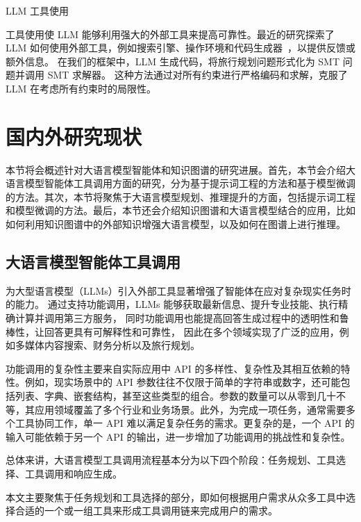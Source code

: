 LLM 工具使用

工具使用使 LLM 能够利用强大的外部工具来提高可靠性。最近的研究探索了 LLM 如何使用外部工具，例如搜索引擎、操作环境和代码生成器~\cite{press2022measuring, yao2022react, schick2024toolformer, liang2023code, singh2023progprompt, peng2023check, song2023llm, huang2022inner}，以提供反馈或额外信息。
在我们的框架中，LLM 生成代码，将旅行规划问题形式化为 SMT 问题并调用 SMT 求解器。
这种方法通过对所有约束进行严格编码和求解，克服了 LLM 在考虑所有约束时的局限性。


\section{国内外研究现状}

本节将会概述针对大语言模型智能体和知识图谱的研究进展。首先，本节会介绍大语言模型智能体工具调用方面的研究，分为基于提示词工程的方法和基于模型微调的方法。其次，本节将聚焦于大语言模型规划、推理提升的方面，包括提示词工程和模型微调的方法。最后，本节还会介绍知识图谱和大语言模型结合的应用，比如如何利用知识图谱中的外部知识增强大语言模型，以及如何在图谱上进行推理。

\subsection{大语言模型智能体工具调用}

为大型语言模型（LLMs）引入外部工具显著增强了智能体在应对复杂现实任务时的能力\cite{huang2024planning, Qin2023, qu2024tool}。
通过支持功能调用，LLMs 能够获取最新信息、提升专业技能、执行精确计算并调用第三方服务，
同时功能调用也能提高回答生成过程中的透明性和鲁棒性，让回答更具有可解释性和可靠性，
因此在多个领域实现了广泛的应用，例如多媒体内容搜索\cite{Song2023}、财务分析\cite{theuma2024equipping}以及旅行规划\cite{hao2024large}。

功能调用的复杂性主要来自实际应用中 API 的多样性、复杂性及其相互依赖的特性\cite{Qin2023}。例如，现实场景中的 API 参数往往不仅限于简单的字符串或数字，还可能包括列表、字典、嵌套结构，甚至这些类型的组合。参数的数量可以从零到几十不等，其应用领域覆盖了多个行业和业务场景\cite{ye2024tooleyes}。此外，为完成一项任务，通常需要多个工具协同工作，单一 API 难以满足复杂任务的需求\cite{huang2024planning}。更复杂的是，一个 API 的输入可能依赖于另一个 API 的输出\cite{Qin2023}，进一步增加了功能调用的挑战性和复杂性。

总体来讲，大语言模型工具调用流程基本分为以下四个阶段：任务规划、工具选择、工具调用和响应生成\cite{Ruan2023, Shen2023, Song2023}。

本文主要聚焦于任务规划和工具选择的部分，即如何根据用户需求从众多工具中选择合适的一个或一组工具来形成工具调用链来完成用户的需求。

